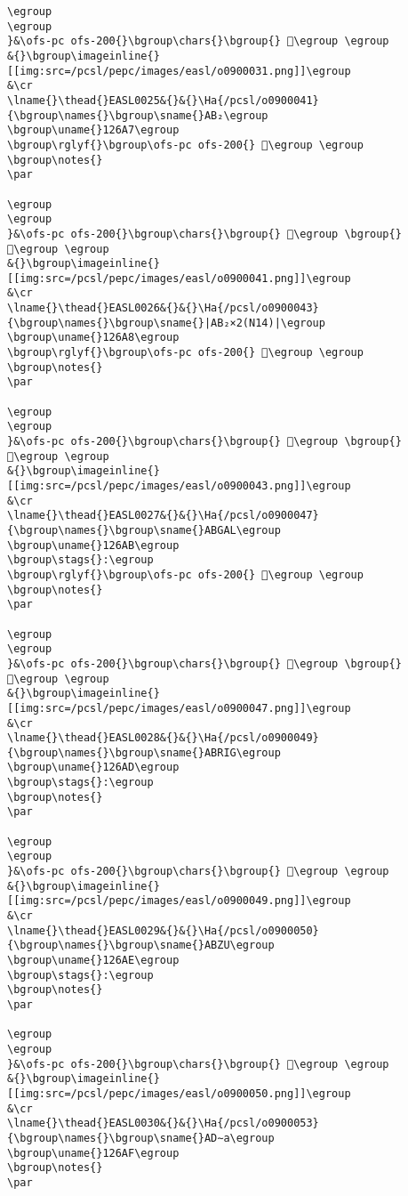 \begin{verbatim}
\egroup
\egroup
}&\ofs-pc ofs-200{}\bgroup\chars{}\bgroup{} 𒚦\egroup \egroup
&{}\bgroup\imageinline{}[[img:src=/pcsl/pepc/images/easl/o0900031.png]]\egroup
&\cr
\lname{}\thead{}EASL0025&{}&{}\Ha{/pcsl/o0900041}{\bgroup\names{}\bgroup\sname{}AB₂\egroup
\bgroup\uname{}126A7\egroup
\bgroup\rglyf{}\bgroup\ofs-pc ofs-200{} 𒚧\egroup \egroup
\bgroup\notes{}
\par 

\egroup
\egroup
}&\ofs-pc ofs-200{}\bgroup\chars{}\bgroup{} 𒚧\egroup \bgroup{} 𒚩\egroup \egroup
&{}\bgroup\imageinline{}[[img:src=/pcsl/pepc/images/easl/o0900041.png]]\egroup
&\cr
\lname{}\thead{}EASL0026&{}&{}\Ha{/pcsl/o0900043}{\bgroup\names{}\bgroup\sname{}|AB₂×2(N14)|\egroup
\bgroup\uname{}126A8\egroup
\bgroup\rglyf{}\bgroup\ofs-pc ofs-200{} 𒚨\egroup \egroup
\bgroup\notes{}
\par 

\egroup
\egroup
}&\ofs-pc ofs-200{}\bgroup\chars{}\bgroup{} 𒚪\egroup \bgroup{} 𒚨\egroup \egroup
&{}\bgroup\imageinline{}[[img:src=/pcsl/pepc/images/easl/o0900043.png]]\egroup
&\cr
\lname{}\thead{}EASL0027&{}&{}\Ha{/pcsl/o0900047}{\bgroup\names{}\bgroup\sname{}ABGAL\egroup
\bgroup\uname{}126AB\egroup
\bgroup\stags{}:\egroup
\bgroup\rglyf{}\bgroup\ofs-pc ofs-200{} 𒚫\egroup \egroup
\bgroup\notes{}
\par 

\egroup
\egroup
}&\ofs-pc ofs-200{}\bgroup\chars{}\bgroup{} 𒚫\egroup \bgroup{} 𒚬\egroup \egroup
&{}\bgroup\imageinline{}[[img:src=/pcsl/pepc/images/easl/o0900047.png]]\egroup
&\cr
\lname{}\thead{}EASL0028&{}&{}\Ha{/pcsl/o0900049}{\bgroup\names{}\bgroup\sname{}ABRIG\egroup
\bgroup\uname{}126AD\egroup
\bgroup\stags{}:\egroup
\bgroup\notes{}
\par 

\egroup
\egroup
}&\ofs-pc ofs-200{}\bgroup\chars{}\bgroup{} 𒚭\egroup \egroup
&{}\bgroup\imageinline{}[[img:src=/pcsl/pepc/images/easl/o0900049.png]]\egroup
&\cr
\lname{}\thead{}EASL0029&{}&{}\Ha{/pcsl/o0900050}{\bgroup\names{}\bgroup\sname{}ABZU\egroup
\bgroup\uname{}126AE\egroup
\bgroup\stags{}:\egroup
\bgroup\notes{}
\par 

\egroup
\egroup
}&\ofs-pc ofs-200{}\bgroup\chars{}\bgroup{} 𒚮\egroup \egroup
&{}\bgroup\imageinline{}[[img:src=/pcsl/pepc/images/easl/o0900050.png]]\egroup
&\cr
\lname{}\thead{}EASL0030&{}&{}\Ha{/pcsl/o0900053}{\bgroup\names{}\bgroup\sname{}AD∼a\egroup
\bgroup\uname{}126AF\egroup
\bgroup\notes{}
\par 


\end{verbatim}
